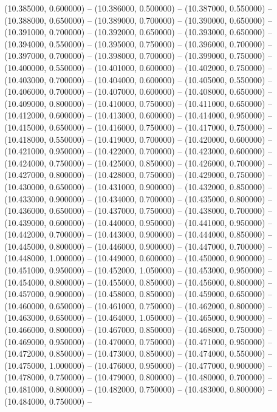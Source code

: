 (10.385000, 0.600000) -- 
(10.386000, 0.500000) -- 
(10.387000, 0.550000) -- 
(10.388000, 0.650000) -- 
(10.389000, 0.700000) -- 
(10.390000, 0.650000) -- 
(10.391000, 0.700000) -- 
(10.392000, 0.650000) -- 
(10.393000, 0.650000) -- 
(10.394000, 0.550000) -- 
(10.395000, 0.750000) -- 
(10.396000, 0.700000) -- 
(10.397000, 0.700000) -- 
(10.398000, 0.700000) -- 
(10.399000, 0.750000) -- 
(10.400000, 0.550000) -- 
(10.401000, 0.600000) -- 
(10.402000, 0.750000) -- 
(10.403000, 0.700000) -- 
(10.404000, 0.600000) -- 
(10.405000, 0.550000) -- 
(10.406000, 0.700000) -- 
(10.407000, 0.600000) -- 
(10.408000, 0.650000) -- 
(10.409000, 0.800000) -- 
(10.410000, 0.750000) -- 
(10.411000, 0.650000) -- 
(10.412000, 0.600000) -- 
(10.413000, 0.600000) -- 
(10.414000, 0.950000) -- 
(10.415000, 0.650000) -- 
(10.416000, 0.750000) -- 
(10.417000, 0.750000) -- 
(10.418000, 0.550000) -- 
(10.419000, 0.700000) -- 
(10.420000, 0.600000) -- 
(10.421000, 0.950000) -- 
(10.422000, 0.700000) -- 
(10.423000, 0.600000) -- 
(10.424000, 0.750000) -- 
(10.425000, 0.850000) -- 
(10.426000, 0.700000) -- 
(10.427000, 0.800000) -- 
(10.428000, 0.750000) -- 
(10.429000, 0.750000) -- 
(10.430000, 0.650000) -- 
(10.431000, 0.900000) -- 
(10.432000, 0.850000) -- 
(10.433000, 0.900000) -- 
(10.434000, 0.700000) -- 
(10.435000, 0.800000) -- 
(10.436000, 0.650000) -- 
(10.437000, 0.750000) -- 
(10.438000, 0.700000) -- 
(10.439000, 0.600000) -- 
(10.440000, 0.950000) -- 
(10.441000, 0.950000) -- 
(10.442000, 0.700000) -- 
(10.443000, 0.900000) -- 
(10.444000, 0.850000) -- 
(10.445000, 0.800000) -- 
(10.446000, 0.900000) -- 
(10.447000, 0.700000) -- 
(10.448000, 1.000000) -- 
(10.449000, 0.600000) -- 
(10.450000, 0.900000) -- 
(10.451000, 0.950000) -- 
(10.452000, 1.050000) -- 
(10.453000, 0.950000) -- 
(10.454000, 0.800000) -- 
(10.455000, 0.850000) -- 
(10.456000, 0.800000) -- 
(10.457000, 0.900000) -- 
(10.458000, 0.850000) -- 
(10.459000, 0.650000) -- 
(10.460000, 0.650000) -- 
(10.461000, 0.750000) -- 
(10.462000, 0.800000) -- 
(10.463000, 0.650000) -- 
(10.464000, 1.050000) -- 
(10.465000, 0.900000) -- 
(10.466000, 0.800000) -- 
(10.467000, 0.850000) -- 
(10.468000, 0.750000) -- 
(10.469000, 0.950000) -- 
(10.470000, 0.750000) -- 
(10.471000, 0.950000) -- 
(10.472000, 0.850000) -- 
(10.473000, 0.850000) -- 
(10.474000, 0.550000) -- 
(10.475000, 1.000000) -- 
(10.476000, 0.950000) -- 
(10.477000, 0.900000) -- 
(10.478000, 0.750000) -- 
(10.479000, 0.800000) -- 
(10.480000, 0.700000) -- 
(10.481000, 0.800000) -- 
(10.482000, 0.750000) -- 
(10.483000, 0.800000) -- 
(10.484000, 0.750000) -- 

